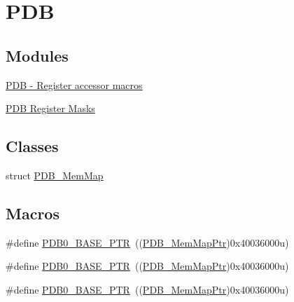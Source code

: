 \hypertarget{group___p_d_b___peripheral}{}\section{P\+DB}
\label{group___p_d_b___peripheral}
\subsection*{Modules}
\begin{DoxyCompactItemize}
\item 
\hyperlink{group___p_d_b___register___accessor___macros}{P\+D\+B -\/ Register accessor macros}
\item 
\hyperlink{group___p_d_b___register___masks}{P\+D\+B Register Masks}
\end{DoxyCompactItemize}
\subsection*{Classes}
\begin{DoxyCompactItemize}
\item 
struct \hyperlink{struct_p_d_b___mem_map}{P\+D\+B\+\_\+\+Mem\+Map}
\end{DoxyCompactItemize}
\subsection*{Macros}
\begin{DoxyCompactItemize}
\item 
\#define \hyperlink{group___p_d_b___peripheral_ga8e197b7c43fd7a0bf1a38caa1918b7b5}{P\+D\+B0\+\_\+\+B\+A\+S\+E\+\_\+\+P\+TR}~((\hyperlink{group___p_d_b___peripheral_ga99a192ea14b33afb792a0de304e131be}{P\+D\+B\+\_\+\+Mem\+Map\+Ptr})0x40036000u)
\item 
\#define \hyperlink{group___p_d_b___peripheral_ga8e197b7c43fd7a0bf1a38caa1918b7b5}{P\+D\+B0\+\_\+\+B\+A\+S\+E\+\_\+\+P\+TR}~((\hyperlink{group___p_d_b___peripheral_ga99a192ea14b33afb792a0de304e131be}{P\+D\+B\+\_\+\+Mem\+Map\+Ptr})0x40036000u)
\item 
\#define \hyperlink{group___p_d_b___peripheral_ga8e197b7c43fd7a0bf1a38caa1918b7b5}{P\+D\+B0\+\_\+\+B\+A\+S\+E\+\_\+\+P\+TR}~((\hyperlink{group___p_d_b___peripheral_ga99a192ea14b33afb792a0de304e131be}{P\+D\+B\+\_\+\+Mem\+Map\+Ptr})0x40036000u)
\end{DoxyCompactItemize}

